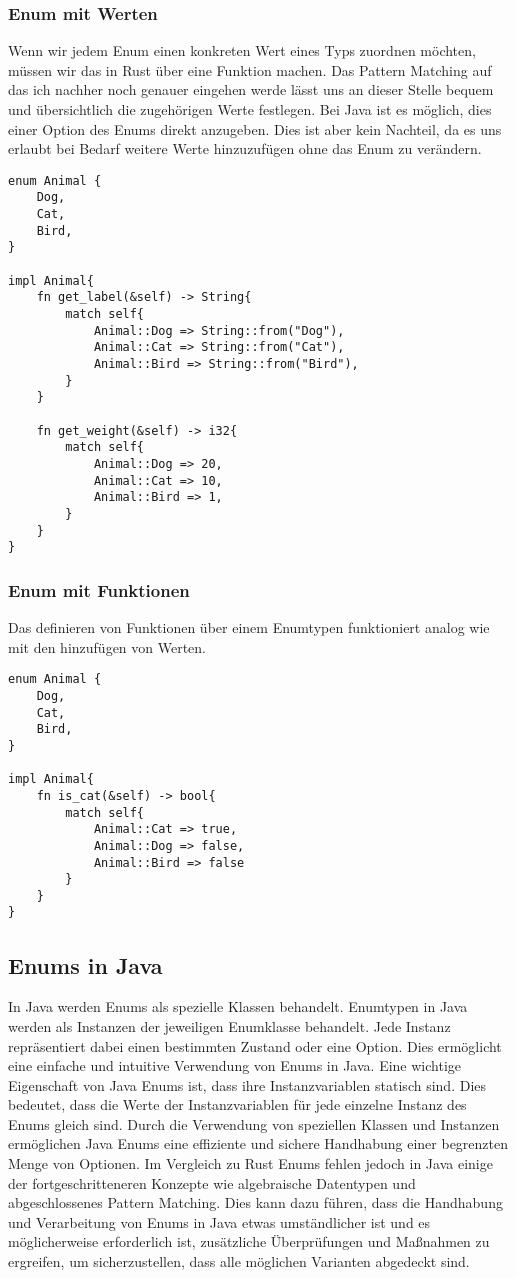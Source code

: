 \documentclass[a4paper, 1ppt]{article}
\begin{document}
\subsubsection{Enum mit Werten}
Wenn wir jedem Enum einen konkreten Wert eines Typs zuordnen möchten, müssen wir das in Rust über eine Funktion machen.
Das Pattern Matching auf das ich nachher noch genauer eingehen werde lässt uns an dieser Stelle bequem und übersichtlich die zugehörigen Werte festlegen.
Bei Java ist es möglich, dies einer Option des Enums direkt anzugeben. Dies ist aber kein Nachteil, da es uns erlaubt bei Bedarf weitere Werte hinzuzufügen ohne das Enum zu verändern.
\begin{verbatim}
enum Animal {
    Dog,
    Cat,
    Bird,
}

impl Animal{
    fn get_label(&self) -> String{
        match self{
            Animal::Dog => String::from("Dog"),
            Animal::Cat => String::from("Cat"),
            Animal::Bird => String::from("Bird"),
        }
    }

    fn get_weight(&self) -> i32{
        match self{
            Animal::Dog => 20,
            Animal::Cat => 10,
            Animal::Bird => 1,
        }
    }
}

\end{verbatim}
\newpage
\subsubsection{Enum mit Funktionen}
Das definieren von Funktionen über einem Enumtypen funktioniert analog wie mit den hinzufügen von Werten.
\begin{verbatim}
enum Animal {
    Dog,
    Cat,
    Bird,
}

impl Animal{
    fn is_cat(&self) -> bool{
        match self{
            Animal::Cat => true,
            Animal::Dog => false,
            Animal::Bird => false
        }
    }
}
\end{verbatim}
\subsection{Enums in Java}
In Java werden Enums als spezielle Klassen behandelt.
Enumtypen in Java werden als Instanzen der jeweiligen Enumklasse behandelt. Jede Instanz repräsentiert dabei einen bestimmten Zustand oder eine Option. Dies ermöglicht eine einfache und intuitive Verwendung von Enums in Java.
Eine wichtige Eigenschaft von Java Enums ist, dass ihre Instanzvariablen statisch sind. Dies bedeutet, dass die Werte der Instanzvariablen für jede einzelne Instanz des Enums gleich sind. 
Durch die Verwendung von speziellen Klassen und Instanzen ermöglichen Java Enums eine effiziente und sichere Handhabung einer begrenzten Menge von Optionen. 
Im Vergleich zu Rust Enums fehlen jedoch in Java einige der fortgeschritteneren Konzepte wie algebraische Datentypen und abgeschlossenes Pattern Matching. Dies kann dazu führen, dass die Handhabung und Verarbeitung von Enums in Java etwas umständlicher ist und es möglicherweise erforderlich ist, zusätzliche Überprüfungen und Maßnahmen zu ergreifen, um sicherzustellen, dass alle möglichen Varianten abgedeckt sind.
\end{document}
